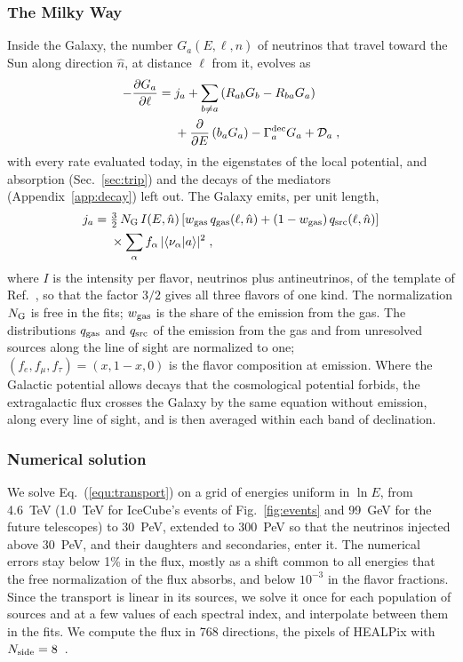 \documentclass[linenumbers, aps, prd, twocolumn, superscriptaddress, floatfix, longbibliography, nofootinbib, bibnotes]{revtex4-2}
\begin{document}
\subsubsection{The Milky Way}
Inside the Galaxy, the number $G_a(E, \ell, \hat n)$ of neutrinos that travel toward the Sun along direction $\hat n$, at distance $\ell$ from it, evolves as
\begin{equation}
 \label{equ:galactic}
 \begin{split}
 -\frac{\partial G_a}{\partial \ell} = \; & j_a + \sum_{b \neq a} \left( R_{ab} G_b - R_{ba} G_a \right) \\
 & + \frac{\partial}{\partial E} \left( b_a G_a \right) - \Gamma^{\rm dec}_a G_a + \mathcal{D}_a \;,
 \end{split}
\end{equation}
with every rate evaluated today, in the eigenstates of the local potential, and absorption (Sec.~\ref{sec:trip}) and the decays of the mediators (Appendix~\ref{app:decay}) left out.
The Galaxy emits, per unit length,
\begin{equation}
 \label{equ:emission}
 \begin{split}
 j_a = \; & \tfrac{3}{2}\, N_{\rm G}\, I(E, \hat n) \left[ w_{\rm gas}\, q_{\rm gas}(\ell, \hat n) + (1 - w_{\rm gas})\, q_{\rm src}(\ell, \hat n) \right] \\
 & \times \sum_\alpha f_\alpha\, |\langle\nu_\alpha|a\rangle|^2 \;,
 \end{split}
\end{equation}
where $I$ is the intensity per flavor, neutrinos plus antineutrinos, of the template of Ref.~\cite{Schwefer:2022zly}, so that the factor $3/2$ gives all three flavors of one kind.
The normalization $N_{\rm G}$ is free in the fits; $w_{\rm gas}$ is the share of the emission from the gas.
The distributions $q_{\rm gas}$ and $q_{\rm src}$ of the emission from the gas and from unresolved sources along the line of sight are normalized to one; $(f_e, f_\mu, f_\tau) = (x, 1-x, 0)$ is the flavor composition at emission.
Where the Galactic potential allows decays that the cosmological potential forbids, the extragalactic flux crosses the Galaxy by the same equation without emission, along every line of sight, and is then averaged within each band of declination.

\subsubsection{Numerical solution}
We solve Eq.~(\ref{equ:transport}) on a grid of energies uniform in $\ln E$, from 4.6~TeV (1.0~TeV for IceCube's events of Fig.~\ref{fig:events} and 99~GeV for the future telescopes) to 30~PeV, extended to 300~PeV so that the neutrinos injected above 30~PeV, and their daughters and secondaries, enter it.
The numerical errors stay below 1\% in the flux, mostly as a shift common to all energies that the free normalization of the flux absorbs, and below $10^{-3}$ in the flavor fractions.
Since the transport is linear in its sources, we solve it once for each population of sources and at a few values of each spectral index, and interpolate between them in the fits.
We compute the flux in 768 directions, the pixels of HEALPix with $N_{\rm side} = 8$~\cite{Gorski:2004by}.
\end{document}
